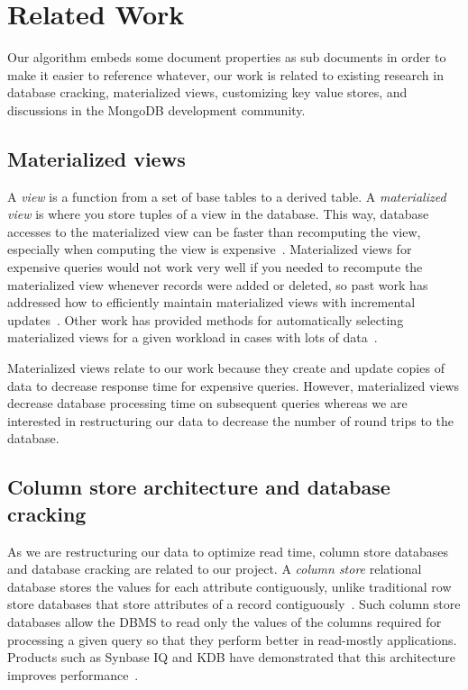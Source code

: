 \section{Related Work}

Our algorithm embeds some document properties as sub documents in order to make it easier to reference whatever, our work is related to existing research in database cracking, materialized views, customizing key value stores, and discussions in the MongoDB development community.

\subsection{Materialized views}
A {\em view} is a function from a set of base tables to a derived table.
A {\em materialized view} is where you store tuples of a view in the database.
This way, database accesses to the materialized view can be faster than recomputing the view, especially when computing the view is expensive~\cite{Gupta1995}.
Materialized views for expensive queries would not work very well if you needed to recompute the materialized view whenever records were added or deleted, so past work has addressed how to efficiently maintain materialized views with incremental updates~\cite{Larson1985,Blakeley1986,Gupta1995,Zhou2007,Zhou2007a}.
Other work has provided methods for automatically selecting materialized views for a given workload in cases with lots of data~\cite{Agrawal2000,Yang1997}. 

Materialized views relate to our work because they create and update copies of data to decrease response time for expensive queries.
However, materialized views decrease database processing time on subsequent queries whereas we are interested in restructuring our data to decrease the number of round trips to the database. 

\subsection{Column store architecture and database cracking}
As we are restructuring our data to optimize read time, column store databases and database cracking are related to our project.
A {\em column store} relational database stores the values for each attribute contiguously, unlike traditional row store databases that store attributes of a record contiguously~\cite{Stonebraker}.
Such column store databases allow the DBMS to read only the values of the columns required for processing a given query so that they perform better in read-mostly applications.
Products such as Synbase IQ and KDB have demonstrated that this architecture improves performance~\cite{Stonebraker,French1995}. 


